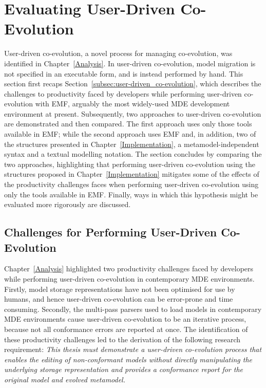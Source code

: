 
\section{Evaluating User-Driven Co-Evolution}
\label{sec:exemplar_user-driven_co-evo}
User-driven co-evolution, a novel process for managing co-evolution, was identified in Chapter~\ref{Analysis}. In user-driven co-evolution, model migration is not specified in an executable form, and is instead performed by hand. This section first recaps Section~\ref{subsec:user-driven_co-evolution}, which describes the challenges to productivity faced by developers while performing user-driven co-evolution with EMF, arguably the most widely-used MDE development environment at present. Subsequently, two approaches to user-driven co-evolution are demonstrated and then compared. The first approach uses only those tools available in EMF; while the second approach uses EMF and, in addition, two of the structures presented in Chapter~\ref{Implementation}, a metamodel-independent syntax and a textual modelling notation. The section concludes by comparing the two approaches, highlighting that performing user-driven co-evolution using the structures proposed in Chapter~\ref{Implementation} mitigates some of the effects of the productivity challenges faces when performing user-driven co-evolution using only the tools available in EMF. Finally, ways in which this hypothesis might be evaluated more rigorously are discussed.


\subsection{Challenges for Performing User-Driven Co-Evolution}
Chapter~\ref{Analysis} highlighted two productivity challenges faced by developers while performing user-driven co-evolution in contemporary MDE environments. Firstly, model storage representations have not been optimised for use by humans, and hence user-driven co-evolution can be error-prone and time consuming. Secondly, the multi-pass parsers used to load models in contemporary MDE environments cause user-driven co-evolution to be an iterative process, because not all conformance errors are reported at once. The identification of these productivity challenges led to the derivation of the following research requirement: \emph{This thesis must demonstrate a user-driven co-evolution process that enables the editing of non-conformant models without directly manipulating the underlying storage representation and provides a conformance report for the original model and evolved metamodel.}

